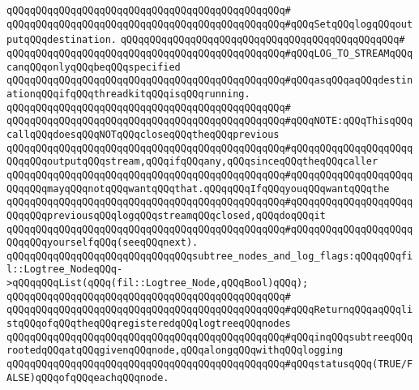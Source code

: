 \verb|qQQqqQQqqQQqqQQqqQQqqQQqqQQqqQQqqQQqqQQqqQQqqQQq#|\newline
\verb|qQQqqQQqqQQqqQQqqQQqqQQqqQQqqQQqqQQqqQQqqQQqqQQq#qQQqSetqQQqlogqQQqoutputqQQqdestination.|\newline
\verb|qQQqqQQqqQQqqQQqqQQqqQQqqQQqqQQqqQQqqQQqqQQqqQQq#|\newline
\verb|qQQqqQQqqQQqqQQqqQQqqQQqqQQqqQQqqQQqqQQqqQQqqQQq#qQQqLOG_TO_STREAMqQQqcanqQQqonlyqQQqbeqQQqspecified|\newline
\verb|qQQqqQQqqQQqqQQqqQQqqQQqqQQqqQQqqQQqqQQqqQQqqQQq#qQQqasqQQqaqQQqdestinationqQQqifqQQqthreadkitqQQqisqQQqrunning.|\newline
\verb|qQQqqQQqqQQqqQQqqQQqqQQqqQQqqQQqqQQqqQQqqQQqqQQq#|\newline
\verb|qQQqqQQqqQQqqQQqqQQqqQQqqQQqqQQqqQQqqQQqqQQqqQQq#qQQqNOTE:qQQqThisqQQqcallqQQqdoesqQQqNOTqQQqcloseqQQqtheqQQqprevious|\newline
\verb|qQQqqQQqqQQqqQQqqQQqqQQqqQQqqQQqqQQqqQQqqQQqqQQq#qQQqqQQqqQQqqQQqqQQqqQQqqQQqoutputqQQqstream,qQQqifqQQqany,qQQqsinceqQQqtheqQQqcaller|\newline
\verb|qQQqqQQqqQQqqQQqqQQqqQQqqQQqqQQqqQQqqQQqqQQqqQQq#qQQqqQQqqQQqqQQqqQQqqQQqqQQqmayqQQqnotqQQqwantqQQqthat.qQQqqQQqIfqQQqyouqQQqwantqQQqthe|\newline
\verb|qQQqqQQqqQQqqQQqqQQqqQQqqQQqqQQqqQQqqQQqqQQqqQQq#qQQqqQQqqQQqqQQqqQQqqQQqqQQqpreviousqQQqlogqQQqstreamqQQqclosed,qQQqdoqQQqit|\newline
\verb|qQQqqQQqqQQqqQQqqQQqqQQqqQQqqQQqqQQqqQQqqQQqqQQq#qQQqqQQqqQQqqQQqqQQqqQQqqQQqyourselfqQQq(seeqQQqnext).|\newline
\newline
\verb|qQQqqQQqqQQqqQQqqQQqqQQqqQQqqQQqsubtree_nodes_and_log_flags:qQQqqQQqfil::Logtree_NodeqQQq->qQQqqQQqList(qQQq(fil::Logtree_Node,qQQqBool)qQQq);|\newline
\verb|qQQqqQQqqQQqqQQqqQQqqQQqqQQqqQQqqQQqqQQqqQQqqQQq#|\newline
\verb|qQQqqQQqqQQqqQQqqQQqqQQqqQQqqQQqqQQqqQQqqQQqqQQq#qQQqReturnqQQqaqQQqlistqQQqofqQQqtheqQQqregisteredqQQqlogtreeqQQqnodes|\newline
\verb|qQQqqQQqqQQqqQQqqQQqqQQqqQQqqQQqqQQqqQQqqQQqqQQq#qQQqinqQQqsubtreeqQQqrootedqQQqatqQQqgivenqQQqnode,qQQqalongqQQqwithqQQqlogging|\newline
\verb|qQQqqQQqqQQqqQQqqQQqqQQqqQQqqQQqqQQqqQQqqQQqqQQq#qQQqstatusqQQq(TRUE/FALSE)qQQqofqQQqeachqQQqnode.|\newline
\newline
\newline
